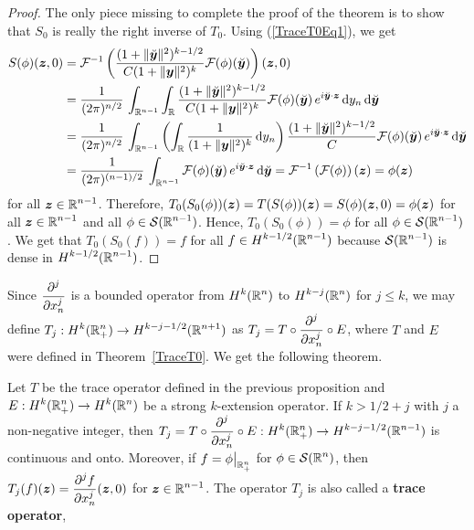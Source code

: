 \begin{proof}
The only piece missing to complete the proof of the theorem is to show
that $S_0$ is really the right inverse of $T_0$.  Using
(\ref{TraceT0Eq1}), we get
\begin{align*}
S(\phi)({\bm{z}},0)
&= \mathcal{F}^{-1}\left(
\frac{(1+\|\breve{{\bm{y}}}\|^2)^{k-1/2}}{C(1+ \|{\bm{y}}\|^2)^k}
\mathcal{F}(\phi)(\breve{{\bm{y}}}) \right)({\bm{z}},0) \\
&= \frac{1}{(2\pi)^{n/2}}\,\int_{\mathbb{R}^{n-1}} \int_{\mathbb{R}} 
\frac{(1+\|\breve{{\bm{y}}}\|^2)^{k-1/2}}{C(1+ \|{\bm{y}}\|^2)^k}
\mathcal{F}(\phi)(\breve{{\bm{y}}})\, e^{i \breve{{\bm{y}}}\cdot {\bm{z}}}
\,\mathrm{d}{y_n} \,\mathrm{d}{\breve{{\bm{y}}}} \\
&= \frac{1}{(2\pi)^{n/2}}\,\int_{\mathbb{R}^{n-1}} \left(
\int_{\mathbb{R}} \frac{1}{(1+ \|{\bm{y}}\|^2)^k} \,\mathrm{d}{y_n} \right)
\frac{(1+\|\breve{{\bm{y}}}\|^2)^{k-1/2}}{C}
\mathcal{F}(\phi)(\breve{{\bm{y}}})\, e^{i \breve{{\bm{y}}}\cdot {\bm{z}}}
\,\mathrm{d}{\breve{{\bm{y}}}} \\
&= \frac{1}{(2\pi)^{(n-1)/2}}\,\int_{\mathbb{R}^{n-1}}
\mathcal{F}(\phi)(\breve{{\bm{y}}})\, e^{i \breve{{\bm{y}}}\cdot {\bm{z}}}
\,\mathrm{d}{\breve{{\bm{y}}}} = \mathcal{F}^{-1}\left(\mathcal{F}(\phi)\right)({\bm{z}})
= \phi({\bm{z}})  
\end{align*}
for all $\displaystyle {\bm{z}} \in \mathbb{R}^{n-1}$.  Therefore,
$T_0(S_0(\phi))({\bm{z}}) = T(S(\phi))({\bm{z}}) = S(\phi)({\bm{z}},0)
= \phi({\bm{z}})$ for all $\displaystyle {\bm{z}} \in \mathbb{R}^{n-1}$ and all
$\displaystyle \phi \in \mathcal{S}(\mathbb{R}^{n-1})$.  Hence,
$T_0(S_0(\phi)) = \phi$ for all $\displaystyle \phi \in \mathcal{S}(\mathbb{R}^{n-1})$.
We get that $T_0(S_0(f)) = f$ for all
$f \in \displaystyle H^{k-1/2}(\mathbb{R}^{n-1})$
because $\displaystyle \mathcal{S}(\mathbb{R}^{n-1})$ is dense in
$\displaystyle H^{k-1/2}(\mathbb{R}^{n-1})$.
\end{proof}

Since $\displaystyle \frac{\displaystyle \partial^{j}{}} {\displaystyle \partial x_n^{j}}$ is a bounded operator from
$\displaystyle H^k(\mathbb{R}^n)$ to $\displaystyle H^{k-j}(\mathbb{R}^n)$ for
$j\leq k$, we may define
$\displaystyle T_j : H^k(\mathbb{R}^n_+) \to H^{k-j -1/2}(\mathbb{R}^{n+1})$ 
as $\displaystyle T_j = T \circ \frac{\displaystyle \partial^{j}{}} {\displaystyle \partial x_n^{j}} \circ E$, where $T$
and $E$ were defined in Theorem~\ref{TraceT0}.  We get the following theorem.

\begin{theorem} \label{TraceTj}
Let $T$ be the trace operator defined in the previous proposition and
$\displaystyle E: H^k(\mathbb{R}^n_+) \to H^k(\mathbb{R}^n)$ be a strong
$k$-extension operator.  If $k > 1/2 +j$ with $j$ a non-negative
integer, then
$\displaystyle T_j = T \circ \frac{\displaystyle \partial^{j}{}} {\displaystyle \partial x_n^{j}} \circ E:H^k(\mathbb{R}^n_+)
\rightarrow H^{k-j-1/2}(\mathbb{R}^{n-1})$
is continuous and onto.
Moreover, if $\displaystyle f = \phi\big|_{\mathbb{R}^n_+}$ for
$\displaystyle \phi \in \mathcal{S}(\mathbb{R}^n)$, then
$\displaystyle T_j(f)({\bm{z}}) = \frac{\displaystyle \partial^{j}{f}} {\displaystyle \partial x_n^{j}}({\bm{z}},0)$ for
$\displaystyle {\bm{z}} \in \mathbb{R}^{n-1}$.
The operator $T_j$ is also called a
{\bfseries trace operator},
\end{theorem}

